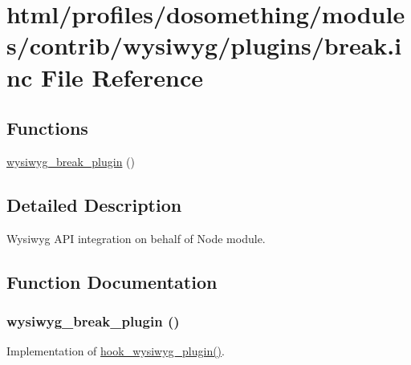 \hypertarget{break_8inc}{
\section{html/profiles/dosomething/modules/contrib/wysiwyg/plugins/break.inc File Reference}
\label{break_8inc}
}
\subsection*{Functions}
\begin{DoxyCompactItemize}
\item 
\hyperlink{break_8inc_a3a35d915e99e7a530e27917741992203}{wysiwyg\_\-break\_\-plugin} ()
\end{DoxyCompactItemize}


\subsection{Detailed Description}
Wysiwyg API integration on behalf of Node module. 

\subsection{Function Documentation}
\hypertarget{break_8inc_a3a35d915e99e7a530e27917741992203}{
\subsubsection[{wysiwyg\_\-break\_\-plugin}]{\setlength{\rightskip}{0pt plus 5cm}wysiwyg\_\-break\_\-plugin ()}}
\label{break_8inc_a3a35d915e99e7a530e27917741992203}
Implementation of \hyperlink{wysiwyg_8api_8php_abad2b35b32be0b20d73006b73205045c}{hook\_\-wysiwyg\_\-plugin()}. 